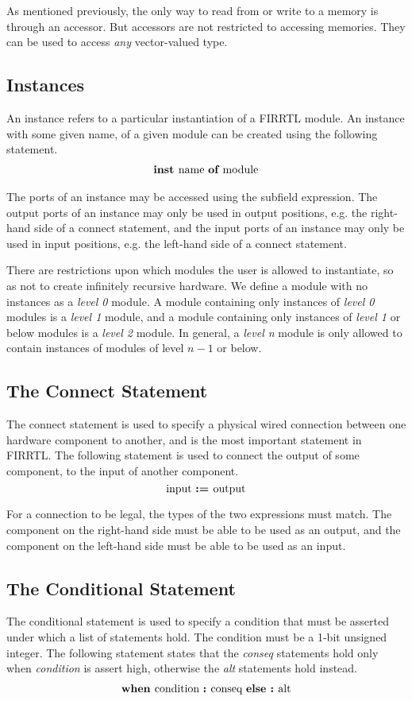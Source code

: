 \documentclass[12pt]{article}
\begin{document}
As mentioned previously, the only way to read from or write to a memory is through an accessor.
But accessors are not restricted to accessing memories.
They can be used to access {\em any} vector-valued type. 

\subsection{Instances}
An instance refers to a particular instantiation of a FIRRTL module.
An instance with some given name, of a given module can be created using the following statement.
\[
\begin{aligned}
\text{\bf inst\ } \text{name } \text{\bf of\ } \text{module}
\end{aligned}
\]

The ports of an instance may be accessed using the subfield expression.
The output ports of an instance may only be used in output positions, e.g. the right-hand side of a connect statement, and the input ports of an instance may only be used in input positions, e.g. the left-hand side of a connect statement.

There are restrictions upon which modules the user is allowed to instantiate, so as not to create infinitely recursive hardware.
We define a module with no instances as a {\em level 0} module.
A module containing only instances of {\em level 0} modules is a {\em level 1} module, and a module containing only instances of {\em level 1} or below modules is a {\em level 2} module.
In general, a {\em level n} module is only allowed to contain instances of modules of level $n-1$ or below. 

\subsection{The Connect Statement}
The connect statement is used to specify a physical wired connection between one hardware component to another, and is the most important statement in FIRRTL.
The following statement is used to connect the output of some component, to the input of another component. 
\[
\text{input } \text{\bf :=\ } \text{output} 
\]

For a connection to be legal, the types of the two expressions must match.
The component on the right-hand side must be able to be used as an output, and the component on the left-hand side must be able to be used as an input.

\subsection{The Conditional Statement}
The conditional statement is used to specify a condition that must be asserted under which a list of statements hold.
The condition must be a 1-bit unsigned integer.
The following statement states that the {\em conseq} statements hold only when {\em condition} is assert high, otherwise the {\em alt} statements hold instead.
\[
\begin{aligned}
\text{\bf when\ } \text{condition } \text{\bf :\ } \text{conseq } \text{\bf else :\ } \text{alt}
\end{aligned}
\]
\end{document}
